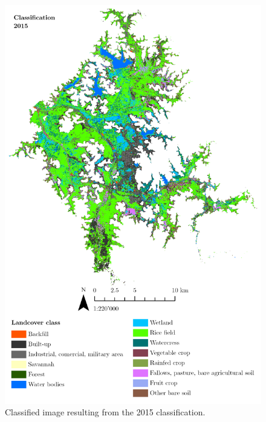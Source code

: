 \begin{figure}[H]
    \centering
    \includegraphics[width = 15cm]{figures/classi2015.png}
    \caption{Classified image resulting from the 2015 classification.}
    \label{}
\end{figure}


